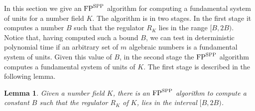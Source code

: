 \documentclass{article}
\newcommand{\FP}{{\rm FP}}
\newcommand{\SPP}{{\rm SPP}}
\newtheorem{lemma}[theorem]{Lemma}
\theoremstyle{definition}\newtheorem{remark}[theorem]{Remark}
\begin{document}
In this section we give an $\FP^{\SPP}$ algorithm for computing a
fundamental system of units for a number field $K$.  The algorithm is
in two stages. In the first stage it computes a number $B$ such that
the regulator $R_K$ lies in the range $[B,2B)$. Notice that, having
computed such a bound $B$, we can test in deterministic polynomial
time if an arbitrary set of $m$ algebraic numbers is a fundamental
system of units. Given this value of $B$, in the second stage the
$\FP^{\SPP}$ algorithm computes a fundamental system of units of
$K$. The first stage is described in the following lemma.
\begin{lemma}\label{stage-one}
  Given a number field $K$, there is an $\FP^{\SPP}$ algorithm to
  compute a constant $B$ such that the regulator $R_K$ of $K$, lies in
  the interval $[B,2B)$.
\end{lemma}
\end{document}
